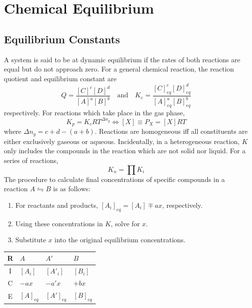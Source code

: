\documentclass{tufte-book}
\begin{document}
\chapter{Chemical Equilibrium}

\section{Equilibrium Constants}

A system is said to be at dynamic equilibrium if the rates of both reactions are equal but do not approach zero. For a general chemical reaction, the reaction quotient and equilibrium constant are
\begin{equation}
  Q = \frac{[C]^c [D]^d}{[A]^a [B]^b} \quad\text{and}\quad K_c = \frac{[C]^c_{eq} [D]^d_{eq}}{[A]^a_{eq} [B]^b_{eq}}
\end{equation}
respectively. For reactions which take place in the gas phase, \begin{equation}
  K_p = K_c RT^{\Delta n_g} \iff [X] \equiv P_X = [X]RT
\end{equation}
where $\Delta n_g = c+d-(a+b)$. Reactions are homogeneous iff all constituents are either exclusively gaseous or aqueous. Incidentally, in a heterogeneous reaction, $K$ only includes the compounds in the reaction which are not solid nor liquid. For a series of reactions, \begin{equation}
  K_n = \prod K_i
\end{equation}
The procedure to calculate final concentrations of specific compounds in a reaction $A \leftrightharpoons B$ is as follows:
\begin{enumerate}
  \item For reactants and products, $[A_i]_{eq} = [A_i] \mp ax$, respectively.
  \item Using these concentrations in $K$, solve for $x$.
  \item Substitute $x$ into the original equilibrium concentrations.
\end{enumerate}
\begin{center}
  \begin{tabular}{clll}
    R & $A$ & $A'$ & $B$ \\
    \hline
    I & $[A_i]$ & $[A'_i]$ & $[B_i]$ \\
    C & $-ax$ & $-a'x$ &  $+bx$ \\
    E & $[A]_{eq}$ & $[A']_{eq}$ & $[B]_{eq}$
  \end{tabular}
\end{center}
\end{document}
